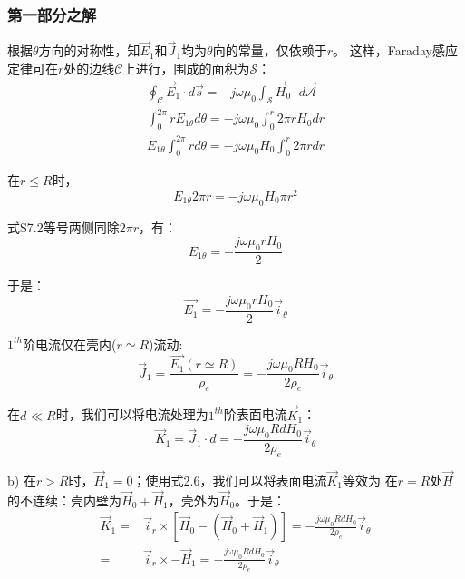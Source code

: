 \subsubsection*{第一部分之解}
根据$\theta$方向的对称性，知$\vec{E}_1$和$\vec{J}_1$均为$\theta$向的常量，仅依赖于$r$。
这样，Faraday感应定律可在$r$处的边线$\mathcal{C}$上进行，围成的面积为$\mathcal{S}$：
\begin{align}
\oint_{\mathcal{C}} \vec{E}_1 \cdot d\vec{s}=-j\omega \mu_0 \int_{\mathcal{S}} \vec{H}_0 \cdot d\vec{\mathcal{A}}\nonumber\\
\int_{0}^{2\pi} r E_{1\theta} d\theta=-j\omega \mu_0 \int_{0}^{r} 2\pi r H_0 dr\nonumber\\
E_{1\theta}\int_{0}^{2\pi} r d\theta=-j\omega \mu_0 H_0\int_{0}^{r} 2\pi r dr\nonumber\tag{S7.1}
\end{align}

在$r\le R$时，
\begin{equation*}
E_{1\theta} 2\pi r = -j\omega \mu_0 H_0 \pi r^2 \tag{S7.2}
\end{equation*}

式S7.2等号两侧同除$2\pi r$，有：
\begin{equation*}
E_{1\theta} = -\frac{j\omega \mu_0 r H_0}{2} \tag{S7.3}
\end{equation*}

于是：
\begin{equation*}
\vec{E_{1}} = -\frac{j\omega \mu_0 r H_0}{2}\vec{i}_\theta \tag{2.56}
\end{equation*}

$1^{th}$阶电流仅在壳内($r\simeq R$)流动:
\begin{equation*}
\vec{J}_1=\frac{\vec{E_{1}}(r\simeq R)}{\rho_e} = -\frac{j\omega \mu_0 R H_0}{2\rho_e}\vec{i}_\theta \tag{2.57}
\end{equation*}

在$d\ll R$时，我们可以将电流处理为$1^{th}$阶表面电流$\vec{K}_1$：
\begin{equation*}
\vec{K}_1=\vec{J}_1 \cdot d= -\frac{j\omega \mu_0 R d H_0}{2\rho_e}\vec{i}_\theta \tag{S7.4}
\end{equation*}

b) 在$r>R$时，$\vec{H}_1=0$；使用式2.6，我们可以将表面电流$\vec{K}_1$等效为
在$r=R$处$\vec{H}$的不连续：壳内壁为$\vec{H}_0+\vec{H}_1$，壳外为$\vec{H}_0$。于是：
\begin{align}
\vec{K}_1=&\vec{i}_r \times [\vec{H}_0-(\vec{H}_0+\vec{H}_1)]=-\frac{j\omega \mu_0 R d H_0}{2\rho_e}\vec{i}_\theta\nonumber\\
=&\vec{i}_r\times-\vec{H}_1=-\frac{j\omega \mu_0 R d H_0}{2\rho_e}\vec{i}_\theta\nonumber\tag{S7.5}
\end{align}

